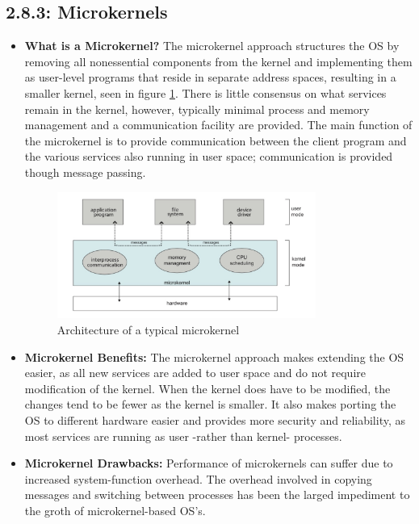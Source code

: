 \documentclass[12pt]{article}
\begin{document}
\subsection*{2.8.3: Microkernels}

\begin{itemize}
    \item \textbf{What is a Microkernel?} The microkernel approach structures the OS by removing all nonessential components from the kernel and implementing them as user-level programs that reside in separate address spaces, resulting in a smaller kernel, seen in figure \ref{fig:microkernel-structure}. There is little consensus on what services remain in the kernel, however, typically minimal process and memory management and a communication facility are provided. The main function of the microkernel is to provide communication between the client program and the various services also running in user space; communication is provided though message passing.
        \begin{figure}[ht]
            \centering
            \includegraphics[width=0.8\textwidth]{figures/microkernel-structure.jpg}
            \caption{Architecture of a typical microkernel}
            \label{fig:microkernel-structure}
        \end{figure}
    \item \textbf{Microkernel Benefits:} The microkernel approach makes extending the OS easier, as all new services are added to user space and do not require modification of the kernel. When the kernel does have to be modified, the changes tend to be fewer as the kernel is smaller. It also makes porting the OS to different hardware easier and provides more security and reliability, as most services are running as user -rather than kernel- processes.
    \item \textbf{Microkernel Drawbacks:} Performance of microkernels can suffer due to increased system-function overhead. The overhead involved in copying messages and switching between processes has been the larged impediment to the groth of microkernel-based OS's.
\end{itemize}
\end{document}
